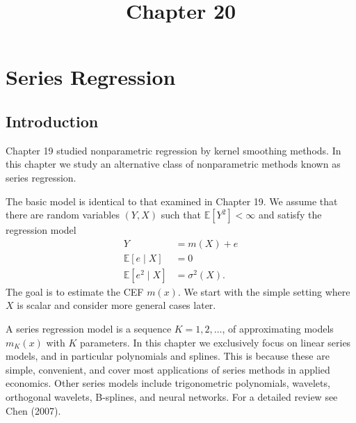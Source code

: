 \documentclass[10pt]{article}
\title{Chapter 20 }
\author{}
\date{}
\begin{document}
\maketitle
\section{Series Regression}
\subsection{Introduction}
Chapter 19 studied nonparametric regression by kernel smoothing methods. In this chapter we study an alternative class of nonparametric methods known as series regression.

The basic model is identical to that examined in Chapter 19. We assume that there are random variables $(Y, X)$ such that $\mathbb{E}\left[Y^{2}\right]<\infty$ and satisfy the regression model
$$
\begin{aligned}
Y &=m(X)+e \\
\mathbb{E}[e \mid X] &=0 \\
\mathbb{E}\left[e^{2} \mid X\right] &=\sigma^{2}(X) .
\end{aligned}
$$
The goal is to estimate the CEF $m(x)$. We start with the simple setting where $X$ is scalar and consider more general cases later.

A series regression model is a sequence $K=1,2, \ldots$, of approximating models $m_{K}(x)$ with $K$ parameters. In this chapter we exclusively focus on linear series models, and in particular polynomials and splines. This is because these are simple, convenient, and cover most applications of series methods in applied economics. Other series models include trigonometric polynomials, wavelets, orthogonal wavelets, B-splines, and neural networks. For a detailed review see Chen (2007).
\end{document}

